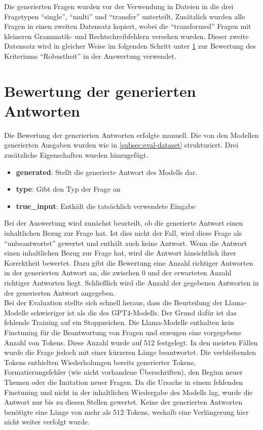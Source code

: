 Die generierten Fragen wurden vor der Verwendung in Dateien in die drei Fragetypen \enquote{single}, \enquote{multi} und \enquote{transfer} unterteilt.
Zusätzlich wurden alle Fragen in einen zweiten Datensatz kopiert, wobei die \enquote{transformed} Fragen mit kleineren Grammatik- und Rechtschreibfehlern versehen wurden.
Dieser zweite Datensatz wird in gleicher Weise im folgenden Schritt unter \cref{sec:answer-rating} zur Bewertung des Kriteriums \enquote{Robustheit} in der Auswertung verwendet.

\section{Bewertung der generierten Antworten}\label{sec:answer-rating}
Die Bewertung der generierten Antworten erfolgte manuell.
Die von den Modellen generierten Ausgaben wurden wie in \cref{subsec:eval-dataset} strukturiert. Drei zusätzliche Eigenschaften wurden hinzugefügt.
\begin{itemize}
    \item \textbf{generated}: Stellt die generierte Antwort des Modells dar.
    \item \textbf{type}: Gibt den Typ der Frage an
    \item \textbf{true\_input}: Enthält die tatsächlich verwendete Eingabe
\end{itemize}

Bei der Auswertung wird zunächst beurteilt, ob die generierte Antwort einen inhaltlichen Bezug zur Frage hat.
Ist dies nicht der Fall, wird diese Frage als \enquote{unbeantwortet} gewertet und enthält auch keine Antwort.
Wenn die Antwort einen inhaltlichen Bezug zur Frage hat, wird die Antwort hinsichtlich ihrer Korrektheit bewertet.
Dazu gibt die Bewertung eine Anzahl richtiger Antworten in der generierten Antwort an, die zwischen 0 und der erwarteten Anzahl richtiger Antworten liegt.
Schließlich wird die Anzahl der gegebenen Antworten in der generierten Antwort angegeben.\\

Bei der Evaluation stellte sich schnell heraus, dass die Beurteilung der Llama-Modelle schwieriger ist als die des GPT4-Modells.
Der Grund dafür ist das fehlende Training auf ein Stoppzeichen.
Die Llama-Modelle enthalten kein Finetuning für die Beantwortung von Fragen und erzeugen eine vorgegebene Anzahl von Tokens.
Diese Anzahl wurde auf 512 festgelegt.
In den meisten Fällen wurde die Frage jedoch mit einer kürzeren Länge beantwortet.
Die verbleibenden Tokens enthielten Wiederholungen bereits generierter Tokens, Formatierungsfehler (wie nicht vorhandene Überschriften), den Beginn neuer Themen oder die Imitation neuer Fragen.
Da die Ursache in einem fehlenden Finetuning und nicht in der inhaltlichen Wiedergabe des Modells lag, wurde die Antwort nur bis zu diesen Stellen gewertet.
Keine der generierten Antworten benötigte eine Länge von mehr als 512 Tokens, weshalb eine Verlängerung hier nicht weiter verfolgt wurde.\\

